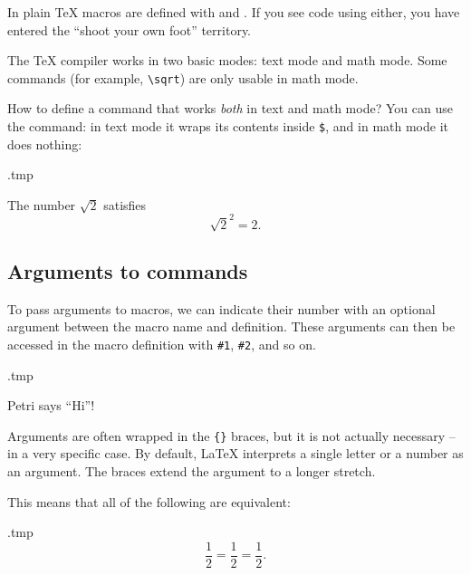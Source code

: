 \begin{warning}
In plain \TeX{} macros are defined with  and .
If you see code using either,
you have entered the ``shoot your own foot'' territory.\footnotemark
\end{warning}


The \TeX{} compiler works in two basic modes: text mode and math mode.
Some commands (for example, \verb|\sqrt|) are only usable in math mode.

How to define a command that works \emph{both} in text and math mode?
You can use the  command: in text mode it wraps its contents inside \verb|$|,
and in math mode it does nothing:
%
\begin{VerbatimOut}{\jobname.tmp}
\newcommand{\magic}{\ensuremath{\sqrt 2}}

The number \magic{} satisfies
\[
\magic^2 = 2.
\]
\end{VerbatimOut}
\ShowExample




%
\subsection{Arguments to commands}

To pass arguments to macros, we can indicate their number with an optional argument
between the macro name and definition.
These arguments can then be accessed in the macro definition with \verb|#1|, \verb|#2|, and so on.

\begin{VerbatimOut}{\jobname.tmp}
\newcommand{\say}[2]{#1 says ``#2''!}

\say{Petri}{Hi}
\end{VerbatimOut}
\ShowExample

Arguments are often wrapped in the \verb|{}| braces,
but it is not actually necessary -- in a very specific case.
By default, \LaTeX{} interprets a single letter or a number as an argument.
The braces extend the argument to a longer stretch.

This means that all of the following are equivalent:

\begin{VerbatimOut}{\jobname.tmp}
\[
\frac{1}{2}
= \frac 1 2
= \frac12.
\]
\end{VerbatimOut}
\ShowExample

